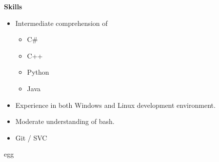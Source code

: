 \documentclass[12pt, letterpaper]{article}
\begin{document}
\begin{flushleft}
\textbf{\large Skills}
\begin{itemize}
	\item Intermediate comprehension of
	\begin{itemize}
		\item C\#
		\item C++
		\item Python
		\item Java
	\end{itemize}
	\item Experience in both Windows and Linux development environment.
	\item Moderate understanding of bash.
	\item Git / SVC
\end{itemize}

\vfill

egg
	\end{flushleft}
	
\end{document}
